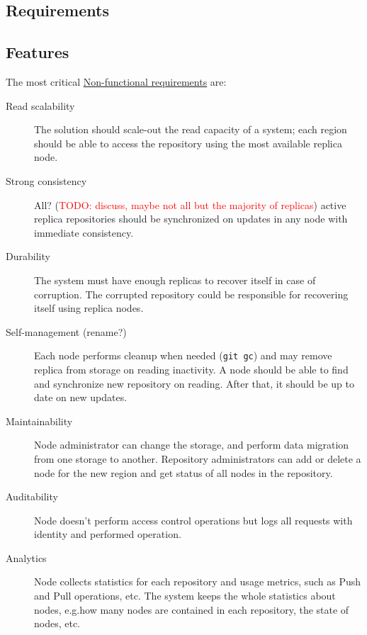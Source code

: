 \documentclass[acmlarge, screen, nonacm, 11pt]{acmart}
\newcommand{\code}[1]{\texttt{#1}}
\newcommand{\todo}[1]{\textcolor{red}{TODO: #1}}
\begin{document}
\begin{itemize}


\section{Requirements}\label{sec:requirements}

\subsection{Features}\label{sec:features}

The most critical
\href{https://en.wikipedia.org/wiki/Non-functional_requirement}{Non-functional requirements}
are:

\begin{description}
  \item[Read scalability]
    The solution should scale-out the read capacity of a system; each region should be able
    to access the repository using the most available replica node.
  \item[Strong consistency]
    All? (\todo{discuss, maybe not all but the majority of replicas})
    active replica repositories should be synchronized on updates in any node
    with immediate consistency.
  \item[Durability]
    The system must have enough replicas to recover itself in case of corruption.
    The corrupted repository could be responsible for recovering itself using replica nodes.
  \item[Self-management (rename?)]
    Each node performs cleanup when needed (\code{git gc}) and may remove replica
    from storage on reading inactivity.
    A node should be able to find and synchronize new repository on reading. After that, it should be up to date on new updates.
  \item[Maintainability]
    Node administrator can change the storage, and perform data migration from one storage
    to another.
    Repository administrators can add or delete a node for the new region and
    get status of all nodes in the repository.
  \item[Auditability]
    Node doesn't perform access control operations but logs all
    requests with identity and performed operation.
  \item[Analytics]
    Node collects statistics for each repository and usage metrics, such as
    Push and Pull operations, etc. The system keeps the whole statistics about
    nodes, e.g.\@ how many nodes are contained in each repository, the state of nodes, etc.
\end{description}


\end{itemize}
\end{document}
